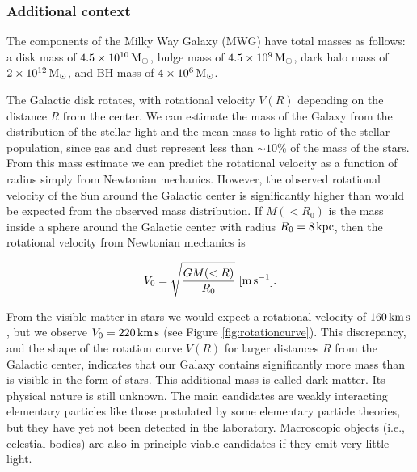 \documentclass[a4paper,10pt]{article}
\begin{document}
\subsubsection{Additional context}

The components of the Milky Way Galaxy (MWG) have total masses as follows: a disk mass of $4.5\times10^{10}\,{\rm M_\odot}$, bulge mass of $4.5\times10^9\,{\rm M_\odot}$, dark halo mass of $2\times10^{12}\,{\rm M_\odot}$, and BH mass of $4\times10^6\,{\rm M_\odot}$.

{\noindent}The Galactic disk rotates, with rotational velocity $V(R)$ depending on the distance $R$ from the center. We can estimate the mass of the Galaxy from the distribution of the stellar light and the mean mass-to-light ratio of the stellar population, since gas and dust represent less than $\sim10$\% of the mass of the stars. From this mass estimate we can predict the rotational velocity as a function of radius simply from Newtonian mechanics. However, the observed rotational velocity of the Sun around the Galactic center is significantly higher than would be expected from the observed mass distribution. If $M(<R_0)$ is the mass inside a sphere around the Galactic center with radius $R_0=8\,{\rm kpc}$, then the rotational velocity from Newtonian mechanics is

\begin{align*}
    V_0 = \sqrt{\frac{GM(<R)}{R_0}} ~ [{\rm m\,s^{-1}}].
\end{align*}

{\noindent}From the visible matter in stars we would expect a rotational velocity of $160\,{\rm km\,s}$, but we observe $V_0=220\,{\rm km\,s}$ (see Figure \ref{fig:rotationcurve}). This discrepancy, and the shape of the rotation curve $V(R)$ for larger distances $R$ from the Galactic center, indicates that our Galaxy contains significantly more mass than is visible in the form of stars. This additional mass is called dark matter. Its physical nature is still unknown. The main candidates are weakly interacting elementary particles like those postulated by some elementary particle theories, but they have yet not been detected in the laboratory. Macroscopic objects (i.e., celestial bodies) are also in principle viable candidates if they emit very little light.
\end{document}
